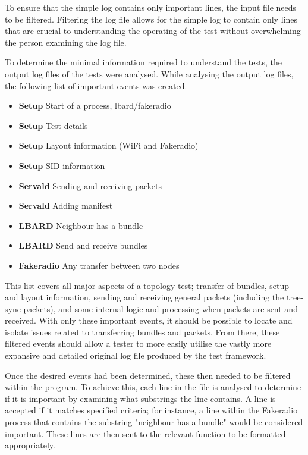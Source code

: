 To ensure that the simple log contains only important lines, the input file needs to be filtered.
Filtering the log file allows for the simple log to contain only lines that are crucial to understanding the operating of the test without overwhelming the person examining the log file.

To determine the minimal information required to understand the tests, the output log files of the tests were analysed.
While analysing the output log files, the following list of important events was created.
\begin{itemize}
    \item \textbf{Setup} Start of a process, lbard/fakeradio
    \item \textbf{Setup} Test details
    \item \textbf{Setup} Layout information (WiFi and Fakeradio)
    \item \textbf{Setup} SID information
    \item \textbf{Servald} Sending and receiving packets
    \item \textbf{Servald} Adding manifest
    \item \textbf{LBARD} Neighbour has a bundle
    \item \textbf{LBARD} Send and receive bundles
    \item \textbf{Fakeradio} Any transfer between two nodes
\end{itemize}
This list covers all major aspects of a topology test; transfer of bundles, setup and layout information, sending and receiving general packets (including the tree-sync packets), and some internal logic and processing when packets are sent and received.
With only these important events, it should be possible to locate and isolate issues related to transferring bundles and packets. 
From there, these filtered events should allow a tester to more easily utilise the vastly more expansive and detailed original log file produced by the test framework. 

Once the desired events had been determined, these then needed to be filtered within the program.
To achieve this, each line in the file is analysed to determine if it is important by examining what substrings the line contains.
A line is accepted if it matches specified criteria; for instance, a line within the Fakeradio process that contains the substring "neighbour has a bundle" would be considered important. 
These lines are then sent to the relevant function to be formatted appropriately.

